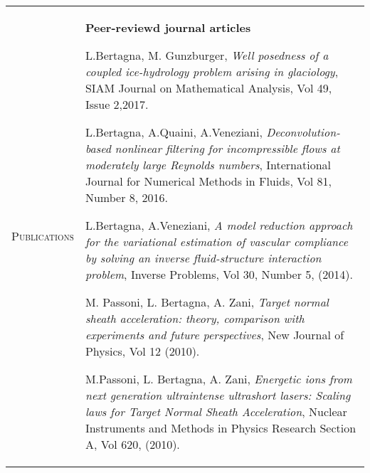 \documentclass[10pt]{article}
\begin{document}
\begin{tabular}{p{2.5cm}|p{15.5cm}}





\end{tabular}

\newpage
\begin{tabular}{p{2.5cm}|p{15.5cm}}
\textsc{Publications} & \textbf{Peer-reviewd journal articles}
\vspace*{0.2cm}

L.Bertagna, M. Gunzburger, \textit{Well posedness of a coupled ice-hydrology problem arising in glaciology}, SIAM Journal on Mathematical Analysis, Vol 49, Issue 2,2017.
\vspace*{0.2cm}

L.Bertagna, A.Quaini, A.Veneziani, \textit{Deconvolution-based nonlinear filtering for incompressible flows at moderately large Reynolds numbers}, International Journal for Numerical Methods in Fluids, Vol 81, Number 8, 2016.
\vspace*{0.2cm}

L.Bertagna, A.Veneziani, \textit{A model reduction approach for the variational estimation of vascular compliance by solving an inverse fluid-structure interaction problem}, Inverse Problems, Vol 30, Number 5, (2014).
\vspace*{0.2cm}

M. Passoni, L. Bertagna, A. Zani, \textit{Target normal sheath acceleration: theory, comparison with experiments and future perspectives}, New Journal of Physics, Vol 12 (2010).
\vspace*{0.2cm}

M.Passoni, L. Bertagna, A. Zani, \textit{Energetic ions from next generation ultraintense ultrashort lasers: Scaling laws for Target Normal Sheath Acceleration}, Nuclear Instruments and Methods in Physics Research Section A, Vol 620, (2010).
\vspace*{0.2cm}


\end{tabular}
\end{document}
